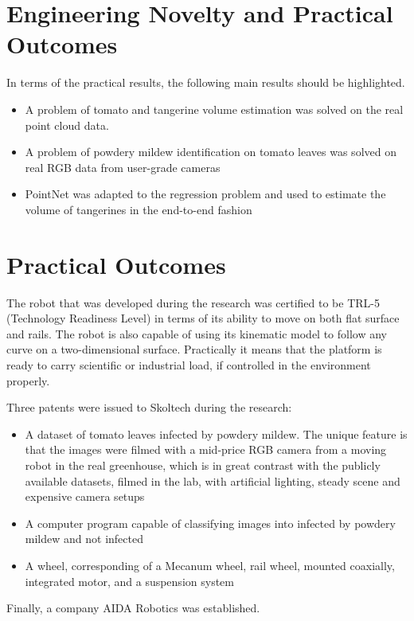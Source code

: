 \section{Engineering Novelty and Practical Outcomes}

In terms of the practical results, the following main results should be highlighted.

\begin{itemize}
    \item A problem of tomato and tangerine volume estimation was solved on the real point cloud data.
    \item A problem of powdery mildew identification on tomato leaves was solved on real RGB data from user-grade cameras
    \item PointNet was adapted to the regression problem and used to estimate the volume of tangerines in the end-to-end fashion

\end{itemize}

\section{Practical Outcomes}

The robot that was developed during the research was certified to be TRL-5 (Technology Readiness Level) in terms of its ability to move on both flat surface and rails.
The robot is also capable of using its kinematic model to follow any curve on a two-dimensional surface.
Practically it means that the platform is ready to carry scientific or industrial load, if controlled in the environment properly.

Three patents were issued to Skoltech during the research:
\begin{itemize}
    \item A dataset of tomato leaves infected by powdery mildew. The unique feature is that the images were filmed with a mid-price RGB camera from a moving robot in the real greenhouse, which is in great contrast with the publicly available datasets, filmed in the lab, with artificial lighting, steady scene and expensive camera setups
    \item A computer program capable of classifying images into infected by powdery mildew and not infected
    \item A wheel, corresponding of a Mecanum wheel, rail wheel, mounted coaxially, integrated motor, and a suspension system
\end{itemize}

Finally, a company AIDA Robotics was established.
